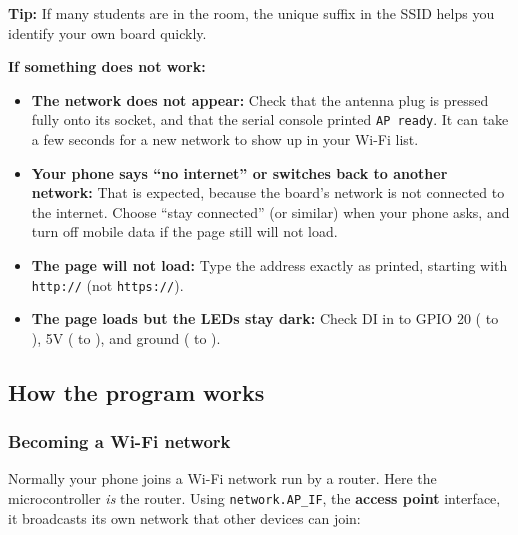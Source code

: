 \begin{tcolorbox}[colback=green!5!white,colframe=green!40!black]
    \textbf{Tip:} If many students are in the room, the unique suffix in the SSID helps you identify
    your own board quickly.
\end{tcolorbox}

\begin{tcolorbox}[colback=yellow!10!white,colframe=yellow!50!black]
    \textbf{If something does not work:}
    \begin{itemize}
        \item \textbf{The network does not appear:} Check that the antenna plug is pressed fully onto its
        socket, and that the serial console printed \texttt{AP ready}. It can take a few seconds for a new
        network to show up in your Wi-Fi list.
        \item \textbf{Your phone says ``no internet'' or switches back to another network:} That is expected,
        because the board's network is not connected to the internet. Choose ``stay connected'' (or similar)
        when your phone asks, and turn off mobile data if the page still will not load.
        \item \textbf{The page will not load:} Type the address exactly as printed, starting with
        \texttt{http://} (not \texttt{https://}).
        \item \textbf{The page loads but the LEDs stay dark:} Check DI in  to GPIO 20
        ( to ), 5V
        ( to ), and ground
        ( to ).
    \end{itemize}
\end{tcolorbox}

\subsection{How the program works}

\subsubsection{Becoming a Wi-Fi network}
Normally your phone joins a Wi-Fi network run by a router. Here the microcontroller \emph{is} the
router. Using \texttt{network.AP\_IF}, the \textbf{access point} interface, it broadcasts its own
network that other devices can join:

